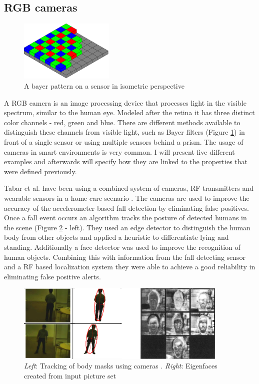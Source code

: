 \subsection{RGB cameras}
\begin{figure}[h]
\centering
\includegraphics[width=0.4\textwidth]{images/bayer_pattern_on_sensor}
\caption{A bayer pattern on a sensor in isometric perspective \cite{img_bayer_pattern}}
\label{fig:bayer_pattern}
\end{figure}
A RGB camera is an image processing device that processes light in the visible spectrum, similar to the human eye. Modeled after the retina it has three distinct color channels - red, green and blue. There are different methods available to distinguish these channels from visible light, such as Bayer filters (Figure \ref{fig:bayer_pattern}) in front of a single sensor or using multiple sensors behind a prism. The usage of cameras in smart environments is very common. I will present five different examples and afterwards will specify how they are linked to the properties that were defined previously.

Tabar et al. have been using a combined system of cameras, RF transmitters and wearable sensors in a home care scenario \cite{tabar2006smart}. The cameras are used to improve the accuracy of the accelerometer-based fall detection by eliminating false positives. Once a fall event occurs an algorithm tracks the posture of detected humans in the scene (Figure \ref{fig:rel_tech_body_face} - left). They used an edge detector to distinguish the human body from other objects and applied a heuristic to differentiate lying and standing.  Additionally a face detector was used to improve the recognition of human objects. Combining this with information from the fall detecting sensor and a RF based localization system they were able to achieve a good reliability in eliminating false positive alerts.
\begin{figure}[h]
\centering
\includegraphics[width=0.9\textwidth]{images/rel_tech_body_face}
\caption{\emph{Left}: Tracking of body masks using cameras  \cite{tabar2006smart}. \emph{Right}: Eigenfaces created from input picture set \cite{pentland2000face}}
\label{fig:rel_tech_body_face}
\end{figure}

